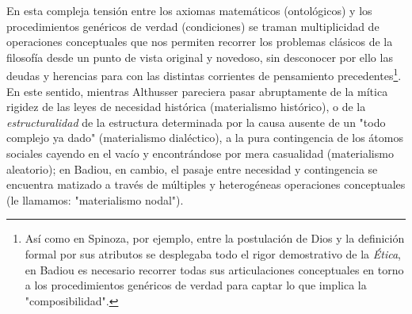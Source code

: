 \documentclass{book}
\begin{document}
En esta compleja tensión entre los axiomas matemáticos (ontológicos) y
los procedimientos genéricos de verdad (condiciones) se traman
multiplicidad de operaciones conceptuales que nos permiten recorrer los
problemas clásicos de la filosofía desde un punto de vista original y
novedoso, sin desconocer por ello las deudas y herencias para con las
distintas corrientes de pensamiento precedentes\footnote{Así como en
  Spinoza, por ejemplo, entre la postulación de Dios y la definición
  formal por sus atributos se desplegaba todo el rigor demostrativo de
  la \emph{Ética}, en Badiou es necesario recorrer todas sus
  articulaciones conceptuales en torno a los procedimientos genéricos de
  verdad para captar lo que implica la "composibilidad".}. En este
sentido, mientras Althusser pareciera pasar abruptamente de la mítica
rigidez de las leyes de necesidad histórica (materialismo histórico), o
de la \emph{estructuralidad} de la estructura determinada por la causa
ausente de un "todo complejo ya dado" (materialismo dialéctico), a la
pura contingencia de los átomos sociales cayendo en el vacío y
encontrándose por mera casualidad (materialismo aleatorio); en Badiou,
en cambio, el pasaje entre necesidad y contingencia se encuentra
matizado a través de múltiples y heterogéneas operaciones conceptuales
(le llamamos: "materialismo nodal").
\end{document}
